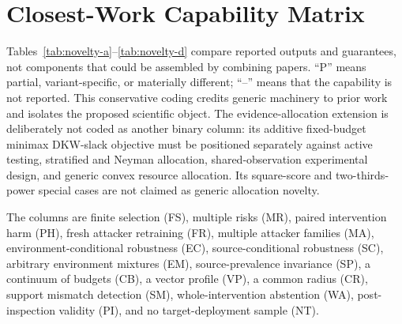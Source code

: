 \section{Closest-Work Capability Matrix}

Tables~\ref{tab:novelty-a}--\ref{tab:novelty-d} compare reported outputs and
guarantees, not components that could be assembled by combining papers. ``P''
means partial, variant-specific, or materially different; ``--'' means that the
capability is not reported. This conservative coding credits generic machinery
to prior work and isolates the proposed scientific object.
The evidence-allocation extension is deliberately not coded as another binary
column: its additive fixed-budget minimax DKW-slack objective must be positioned
separately against active testing, stratified and Neyman allocation,
shared-observation experimental design, and generic convex resource allocation.
Its square-score and two-thirds-power special cases are not claimed as generic
allocation novelty.

The columns are finite selection (FS), multiple risks (MR), paired intervention
harm (PH), fresh attacker retraining (FR), multiple attacker families (MA),
environment-conditional robustness (EC), source-conditional robustness (SC),
arbitrary environment mixtures (EM), source-prevalence invariance (SP), a
continuum of budgets (CB), a vector profile (VP), a common radius (CR), support
mismatch detection (SM), whole-intervention abstention (WA), post-inspection
validity (PI), and no target-deployment sample (NT).

